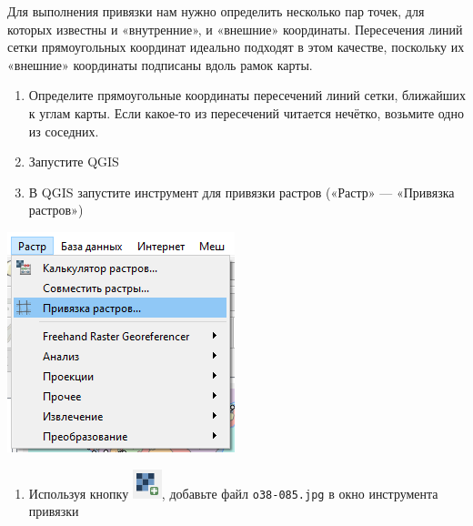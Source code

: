 \documentclass[
  12pt,
]{book}
\providecommand{\tightlist}{%
  \setlength{\itemsep}{0pt}\setlength{\parskip}{0pt}}
\begin{document}
Для выполнения привязки нам нужно определить несколько пар точек, для которых известны и «внутренние», и «внешние» координаты. Пересечения линий сетки прямоугольных координат идеально подходят в этом качестве, поскольку их «внешние» координаты подписаны вдоль рамок карты.

\begin{enumerate}
\def\labelenumi{\arabic{enumi}.}
\setcounter{enumi}{2}
\item
  Определите прямоугольные координаты пересечений линий сетки, ближайших к углам карты. Если какое-то из пересечений читается нечётко, возьмите одно из соседних.
\item
  Запустите QGIS
\item
  В QGIS запустите инструмент для привязки растров («Растр» --- «Привязка растров»)
\end{enumerate}

\includegraphics{images/Ex05_Reference/RasterReference0.png}

\begin{enumerate}
\def\labelenumi{\arabic{enumi}.}
\setcounter{enumi}{5}
\tightlist
\item
  Используя кнопку \includegraphics{images/Ex05_Reference/addRasterButton.png}, добавьте файл \texttt{o38-085.jpg} в окно инструмента привязки
\end{enumerate}
\end{document}
